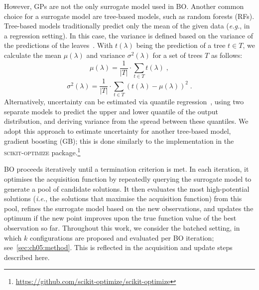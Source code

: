 However, GPs are not the only surrogate model used in BO. Another common choice for a surrogate model are tree-based models, 
such as random forests (RFs). 
Tree-based models traditionally predict only the mean of the given data (\emph{e.g.}, in a regression setting). 
In this case, the variance is defined based on the variance of the predictions of the leaves~\citep{HutEtAl11}. 
With $t(\lambda)$ being the prediction of a tree $t \in T$, we calculate the mean $\mu(\lambda)$ and variance $\sigma^2(\lambda)$ for a set of trees $T$ as follows:
\begin{equation}
    \mu(\lambda)=\frac{1}{|T|} \cdot \sum_{t\in T} t(\lambda) \; ,
\end{equation}
\begin{equation}
    \sigma^2(\lambda)=\frac{1}{|T|} \cdot \sum_{t\in T} (t(\lambda) - \mu(\lambda))^2 \; .
\end{equation}
Alternatively, uncertainty can be estimated via quantile regression~\citep{KoeBas78}, using two separate models to predict the upper and lower quantile of the output distribution, and deriving variance from the spread between these quantiles.
We adopt this approach to estimate uncertainty for another tree-based model, gradient boosting (GB); this is done similarly to the implementation in the \textsc{scikit-optimize} package.\footnote{\url{https://github.com/scikit-optimize/scikit-optimize}}

BO proceeds iteratively until a termination criterion is met. In each iteration, it optimises the acquisition function %
by repeatedly querying the surrogate model to generate a pool of candidate solutions. It then evaluates the most high-potential solutions (\emph{i.e.}, the solutions that maximise the acquisition function) from this pool,
refines the surrogate model based on the new observations, and updates the optimum if the new point improves upon the true function value of the best observation so far.
Throughout this work, we consider the batched setting, in which $k$ configurations are proposed and evaluated per BO iteration; see~\cref{sec:ch05:method}. This is reflected in the acquisition and update steps described here.

